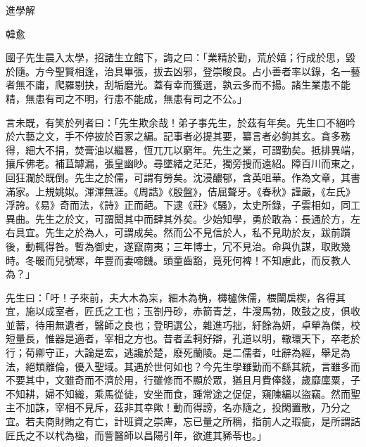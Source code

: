 進學解

韓愈

國子先生晨入太學，招諸生立館下，誨之曰：「業精於勤，荒於嬉；行成於思，毀於隨。方今聖賢相逢，治具畢張，拔去凶邪，登崇畯良。占小善者率以錄，名一藝者無不庸，爬羅剔抉，刮垢磨光。蓋有幸而獲選，孰云多而不揚。諸生業患不能精，無患有司之不明，行患不能成，無患有司之不公。」

言未既，有笑於列者曰：「先生欺余哉！弟子事先生，於茲有年矣。先生口不絕吟於六藝之文，手不停披於百家之編。記事者必提其要，纂言者必鉤其玄。貪多務得，細大不捐，焚膏油以繼晷，恆兀兀以窮年。先生之業，可謂勤矣。抵排異端，攘斥佛老。補苴罅漏，張皇幽眇。尋墜緒之茫茫，獨旁搜而遠紹。障百川而東之，回狂瀾於既倒。先生之於儒，可謂有勞矣。沈浸醲郁，含英咀華。作為文章，其書滿家。上規姚姒。渾渾無涯。《周誥》《殷盤》，佶屈聱牙。《春秋》謹嚴，《左氏》浮誇。《易》奇而法，《詩》正而葩。下逮《莊》《騷》，太史所錄，子雲相如，同工異曲。先生之於文，可謂閎其中而肆其外矣。少始知學，勇於敢為：長通於方，左右具宜。先生之於為人，可謂成矣。然而公不見信於人，私不見助於友，跋前躓後，動輒得咎。暫為御史，遂竄南夷；三年博士，冗不見治。命與仇謀，取敗幾時。冬暖而兒號寒，年豐而妻啼饑。頭童齒豁，竟死何裨！不知慮此，而反教人為？」

先生曰：「吁！子來前，夫大木為杗，細木為桷，欂櫨侏儒，椳闑扂楔，各得其宜，施以成室者，匠氏之工也；玉劄丹砂，赤箭青芝，牛溲馬勃，敗鼓之皮，俱收並蓄，待用無遺者，醫師之良也；登明選公，雜進巧拙，紆餘為妍，卓犖為傑，校短量長，惟器是適者，宰相之方也。昔者孟軻好辯，孔道以明，轍環天下，卒老於行；荀卿守正，大論是宏，逃讒於楚，廢死蘭陵。是二儒者，吐辭為經，舉足為法，絕類離倫，優入聖域。其遇於世何如也？今先生學雖勤而不繇其統，言雖多而不要其中，文雖奇而不濟於用，行雖修而不顯於眾，猶且月費俸錢，歲靡廩粟，子不知耕，婦不知織，乘馬從徒，安坐而食，踵常途之促促，窺陳編以盜竊。然而聖主不加誅，宰相不見斥，茲非其幸歟！動而得謗，名亦隨之，投閑置散，乃分之宜。若夫商財賄之有亡，計班資之崇庳，忘已量之所稱，指前人之瑕疵，是所謂詰匠氏之不以杙為楹，而訾醫師以昌陽引年，欲進其豨苓也。」